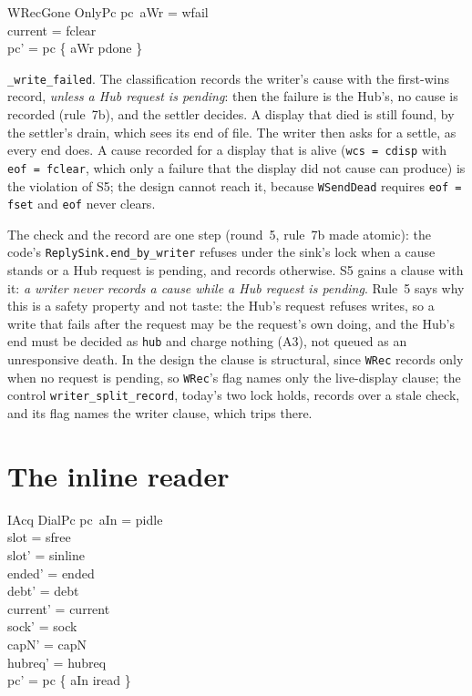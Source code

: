\documentclass[a4paper,10pt,fleqn]{article}
\begin{document}
\begin{schema}{WRecGone}
  OnlyPc
\where
  pc~aWr = wfail \\
  current = fclear \\
  pc' = pc \oplus \{ aWr \mapsto pdone \}
\end{schema}

\texttt{\_write\_failed}.  The classification records the writer's cause with the
first-wins record, \emph{unless a Hub request is pending}: then the failure is the
Hub's, no cause is recorded (rule~7b), and the settler decides.  A display that
died is still found, by the settler's drain, which sees its end of file.  The
writer then asks for a settle, as every end does.  A cause recorded for a display
that is alive (\texttt{wcs = cdisp} with \texttt{eof = fclear}, which only a
failure that the display did not cause can produce) is the violation of S5; the
design cannot reach it, because \texttt{WSendDead} requires \texttt{eof = fset}
and \texttt{eof} never clears.

The check and the record are one step (round~5, rule~7b made atomic): the code's
\texttt{ReplySink.end\_by\_writer} refuses under the sink's lock when a cause stands
or a Hub request is pending, and records otherwise.  S5 gains a clause with it:
\emph{a writer never records a cause while a Hub request is pending}.  Rule~5 says
why this is a safety property and not taste: the Hub's request refuses writes, so
a write that fails after the request may be the request's own doing, and the
Hub's end must be decided as \texttt{hub} and charge nothing (A3), not queued as
an unresponsive death.  In the design the clause is structural, since
\texttt{WRec} records only when no request is pending, so \texttt{WRec}'s flag
names only the live-display clause; the control \texttt{writer\_split\_record},
today's two lock holds, records over a stale check, and its flag names the
writer clause, which trips there.

\section{The inline reader}

\begin{schema}{IAcq}
  DialPc
\where
  pc~aIn = pidle \\
  slot = sfree \\
  slot' = sinline \\
  ended' = ended \\
  debt' = debt \\
  current' = current \\
  sock' = sock \\
  capN' = capN \\
  hubreq' = hubreq \\
  pc' = pc \oplus \{ aIn \mapsto iread \}
\end{schema}
\end{document}
